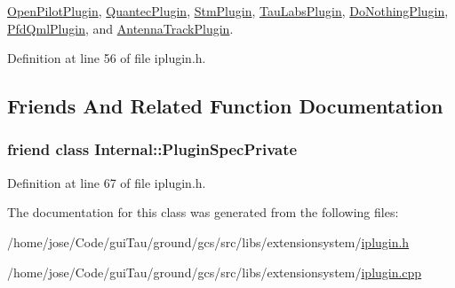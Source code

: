 \hyperlink{group___boards___open_pilot_plugin_gab41fd915d672acefc699cd2185ac1037}{Open\-Pilot\-Plugin}, \hyperlink{group___boards___quantec_plugin_ga775ecc021e3638b3652f5e49edd2f748}{Quantec\-Plugin}, \hyperlink{group___boards___stm_ga0f818aaaedbf072833aef3d3ac944593}{Stm\-Plugin}, \hyperlink{group___boards___tau_labs_plugin_ga7c69e7ef31a4c5b510b1aa88de11dda9}{Tau\-Labs\-Plugin}, \hyperlink{group___do_nothing_plugin_gaa91993d8fa19262963650daf59993688}{Do\-Nothing\-Plugin}, \hyperlink{class_pfd_qml_plugin_a39d4ab7d539a9a77adc57b8ecf33e781}{Pfd\-Qml\-Plugin}, and \hyperlink{class_antenna_track_plugin_a3628ddddb3154268c34dfd1f69c6e8f4}{Antenna\-Track\-Plugin}.



Definition at line 56 of file iplugin.\-h.



\subsection{Friends And Related Function Documentation}
\hypertarget{class_extension_system_1_1_i_plugin_ab527aa6637a3541a3260928aef682007}{
\subsubsection[{Internal\-::\-Plugin\-Spec\-Private}]{\setlength{\rightskip}{0pt plus 5cm}friend class {\bf Internal\-::\-Plugin\-Spec\-Private}\hspace{0.3cm}{\ttfamily [friend]}}}\label{class_extension_system_1_1_i_plugin_ab527aa6637a3541a3260928aef682007}


Definition at line 67 of file iplugin.\-h.



The documentation for this class was generated from the following files\-:\begin{DoxyCompactItemize}
\item 
/home/jose/\-Code/gui\-Tau/ground/gcs/src/libs/extensionsystem/\hyperlink{iplugin_8h}{iplugin.\-h}\item 
/home/jose/\-Code/gui\-Tau/ground/gcs/src/libs/extensionsystem/\hyperlink{iplugin_8cpp}{iplugin.\-cpp}\end{DoxyCompactItemize}
